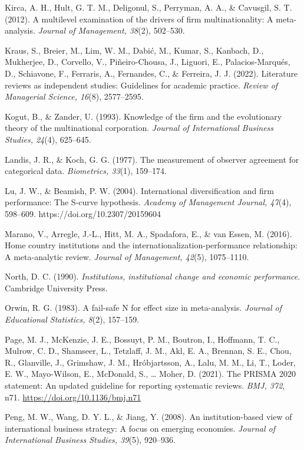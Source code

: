 \documentclass[
  12pt,a4paper]{article}
\begin{document}
Kirca, A. H., Hult, G. T. M., Deligonul, S., Perryman, A. A., \&
Cavusgil, S. T. (2012). A multilevel examination of the drivers of firm
multinationality: A meta-analysis. \emph{Journal of Management, 38}(2),
502--530.

Kraus, S., Breier, M., Lim, W. M., Dabić, M., Kumar, S., Kanbach, D.,
Mukherjee, D., Corvello, V., Piñeiro-Chousa, J., Liguori, E.,
Palacios-Marqués, D., Schiavone, F., Ferraris, A., Fernandes, C., \&
Ferreira, J. J. (2022). Literature reviews as independent studies:
Guidelines for academic practice. \emph{Review of Managerial Science,
16}(8), 2577--2595.

Kogut, B., \& Zander, U. (1993). Knowledge of the firm and the
evolutionary theory of the multinational corporation. \emph{Journal of
International Business Studies, 24}(4), 625--645.

Landis, J. R., \& Koch, G. G. (1977). The measurement of observer
agreement for categorical data. \emph{Biometrics, 33}(1), 159--174.

Lu, J. W., \& Beamish, P. W. (2004). International diversification and
firm performance: The S-curve hypothesis. \emph{Academy of Management
Journal, 47}(4), 598--609. https://doi.org/10.2307/20159604

Marano, V., Arregle, J.-L., Hitt, M. A., Spadafora, E., \& van Essen, M.
(2016). Home country institutions and the
internationalization-performance relationship: A meta-analytic review.
\emph{Journal of Management, 42}(5), 1075--1110.

North, D. C. (1990). \emph{Institutions, institutional change and
economic performance}. Cambridge University Press.

Orwin, R. G. (1983). A fail-safe N for effect size in meta-analysis.
\emph{Journal of Educational Statistics, 8}(2), 157--159.

Page, M. J., McKenzie, J. E., Bossuyt, P. M., Boutron, I., Hoffmann, T.
C., Mulrow, C. D., Shamseer, L., Tetzlaff, J. M., Akl, E. A., Brennan,
S. E., Chou, R., Glanville, J., Grimshaw, J. M., Hróbjartsson, A., Lalu,
M. M., Li, T., Loder, E. W., Mayo-Wilson, E., McDonald, S., \ldots{}
Moher, D. (2021). The PRISMA 2020 statement: An updated guideline for
reporting systematic reviews. \emph{BMJ, 372}, n71.
\url{https://doi.org/10.1136/bmj.n71}

Peng, M. W., Wang, D. Y. L., \& Jiang, Y. (2008). An institution-based
view of international business strategy: A focus on emerging economies.
\emph{Journal of International Business Studies, 39}(5), 920--936.
\end{document}
